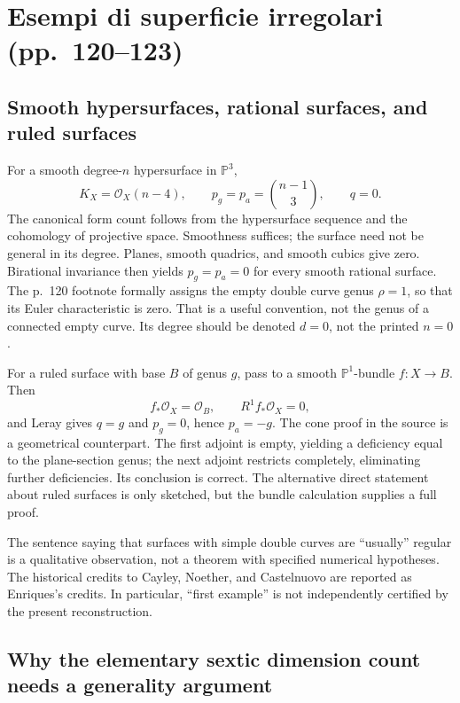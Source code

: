 \section[Superficie irregolari]{Esempi di superficie irregolari (pp.~120--123)}\label{enriques-iv-7}

\subsection{Smooth hypersurfaces, rational surfaces, and ruled surfaces}

For a smooth degree-\(n\) hypersurface in \(\mathbb P^3\), \[
 K_X=\mathcal O_X(n-4),\qquad
 p_g=p_a=\binom{n-1}{3},\qquad q=0.
\] The canonical form count follows from the hypersurface sequence and the cohomology of projective space. Smoothness suffices; the surface need not be general in its degree. Planes, smooth quadrics, and smooth cubics give zero. Birational invariance then yields \(p_g=p_a=0\) for every smooth rational surface. The p.~120 footnote formally assigns the empty double curve genus \(\rho=1\), so that its Euler characteristic is zero. That is a useful convention, not the genus of a connected empty curve. Its degree should be denoted \(d=0\), not the printed \(n=0\).

For a ruled surface with base \(B\) of genus \(g\), pass to a smooth \(\mathbb P^1\)-bundle \(f:X\to B\). Then \[
 f_*\mathcal O_X=\mathcal O_B,\qquad R^1f_*\mathcal O_X=0,
\] and Leray gives \(q=g\) and \(p_g=0\), hence \(p_a=-g\). The cone proof in the source is a geometrical counterpart. The first adjoint is empty, yielding a deficiency equal to the plane-section genus; the next adjoint restricts completely, eliminating further deficiencies. Its conclusion is correct. The alternative direct statement about ruled surfaces is only sketched, but the bundle calculation supplies a full proof.

The sentence saying that surfaces with simple double curves are ``usually'' regular is a qualitative observation, not a theorem with specified numerical hypotheses. The historical credits to Cayley, Noether, and Castelnuovo are reported as Enriques's credits. In particular, ``first example'' is not independently certified by the present reconstruction.

\subsection{Why the elementary sextic dimension count needs a generality argument}

